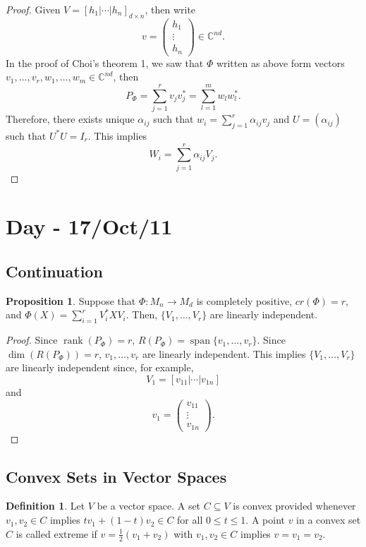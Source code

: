\documentclass[12pt]{article}
\theoremstyle{definition}
\newtheorem*{proposition}{Proposition}
\newtheorem*{definition}{Definition}
\newcommand{\C}{\mathbb{C}}
\begin{document}
\begin{proof}
Given $V=[h_1|\cdots|h_n]_{d\times n}$, then write
\[
v = \begin{pmatrix}h_1\\ \vdots \\ h_n\end{pmatrix} \in \C^{nd}.
\]
In the proof of Choi's theorem 1, we saw that $\Phi$ written as above form vectors $v_1,\ldots,v_r,w_1,\ldots,w_m \in \C^{nd}$, then
\[
P_\Phi = \sum_{j=1}^r v_jv_j^* = \sum_{l=1}^m w_lw_l^*.
\]
Therefore, there exists unique $\alpha_{ij}$ such that $w_i = \sum_{j=1}^r \alpha_{ij}v_j$ and $U=(\alpha_{ij})$ such that $U^*U=I_r$. This implies
\[
W_i = \sum_{j=1}^r \alpha_{ij}V_j.
\]
\end{proof}

\section{Day - 17/Oct/11}

\subsection{Continuation}

\begin{proposition}
Suppose that $\Phi : M_n \to M_d$ is completely positive, $cr(\Phi)=r$, and $\Phi(X)=\sum_{i=1}^r V_i^*XV_i$. Then, $\{V_1,\ldots,V_r\}$ are linearly independent.
\end{proposition}

\begin{proof}
Since $\operatorname{rank}(P_\Phi)=r$, $R(P_\Phi)=\operatorname{span}\{v_1,\ldots,v_r\}$. Since $\dim(R(P_\Phi))=r$, $v_1,\ldots,v_r$ are linearly independent. This implies $\{V_1,\ldots,V_r\}$ are linearly independent since, for example,
\[
V_1 = [v_{11}|\cdots|v_{1n}]
\]
and
\[
v_1 = \begin{pmatrix}v_{11}\\ \vdots \\ v_{1n}\end{pmatrix}.
\]
\end{proof}

\subsection{Convex Sets in Vector Spaces}

\begin{definition}
Let $V$ be a vector space. A set $C \subseteq V$ is convex provided whenever $v_1,v_2 \in C$ implies $tv_1+(1-t)v_2 \in C$ for all $0 \leq t \leq 1$.
A point $v$ in a convex set $C$ is called extreme if $v=\frac{1}{2}(v_1+v_2)$ with $v_1,v_2 \in C$ implies $v=v_1=v_2$.
\end{definition}
\end{document}
